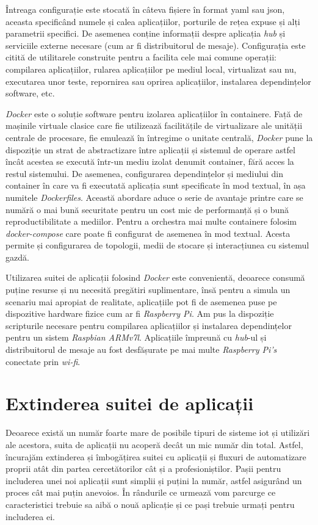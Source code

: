 Întreaga configurație este stocată în câteva fișiere în format \acrfull{yaml} sau \acrshort{json}, aceasta specificând numele și calea aplicațiilor, porturile de rețea expuse și alți parametrii specifici. De asemenea conține informații despre aplicația \textit{hub} și serviciile externe necesare (cum ar fi distribuitorul de mesaje). Configurația este citită de utilitarele construite pentru a facilita cele mai comune operații: compilarea aplicațiilor, rularea aplicațiilor pe mediul local, virtualizat sau nu, executarea unor teste, repornirea sau oprirea aplicațiilor, instalarea dependințelor software, etc.

\textit{Docker} este o soluție software pentru izolarea aplicațiilor în containere. Față de mașinile virtuale clasice care fie utilizează facilitățile de virtualizare ale unității centrale de procesare, fie emulează în întregime o unitate centrală, \textit{Docker} pune la dispoziție un strat de abstractizare între aplicații și sistemul de operare astfel încât acestea se execută într-un mediu izolat denumit container, fără acces la restul sistemului. De asemenea, configurarea dependințelor și mediului din container în care va fi executată aplicația sunt specificate în mod textual, în așa numitele \textit{Dockerfiles}. Această abordare aduce o serie de avantaje printre care se numără o mai bună securitate pentru un cost mic de performanță și o bună reproductibilitate a mediilor. Pentru a orchestra mai multe containere folosim \textit{docker-compose} care poate fi configurat de asemenea în mod textual. Acesta permite și configurarea de topologii, medii de stocare și interacțiunea cu sistemul gazdă.

Utilizarea suitei de aplicații folosind \textit{Docker} este convenientă, deoarece consumă puține resurse și nu necesită pregătiri suplimentare, însă pentru a simula un scenariu mai apropiat de realitate, aplicațiile pot fi de asemenea puse pe dispozitive hardware fizice cum ar fi \textit{Raspberry Pi}. Am pus la dispoziție scripturile necesare pentru compilarea aplicațiilor și instalarea dependințelor pentru un sistem \textit{Raspbian ARMv7l}. Aplicațiile împreună cu \textit{hub}-ul și distribuitorul de mesaje au fost desfășurate pe mai multe \textit{Raspberry Pi's} conectate prin \textit{wi-fi}.

\section{Extinderea suitei de aplicații}

Deoarece există un număr foarte mare de posibile tipuri de sisteme \acrshort{iot} și utilizări ale acestora, suita de aplicații nu acoperă decât un mic număr din total. Astfel, încurajăm extinderea și îmbogățirea suitei cu aplicații și fluxuri de automatizare proprii atât din partea cercetătorilor cât și a profesioniștilor. Pașii pentru includerea unei noi aplicații sunt simplii și puțini la număr, astfel asigurând un proces cât mai puțin anevoios. În rândurile ce urmează vom parcurge ce caracteristici trebuie sa aibă o nouă aplicație și ce pași trebuie urmați pentru includerea ei.

